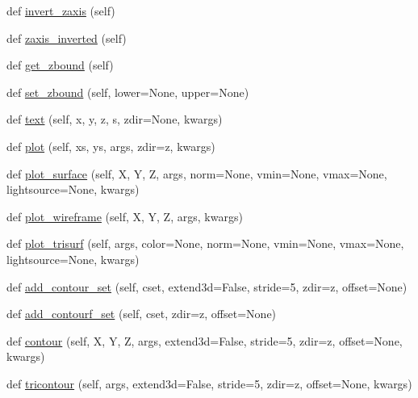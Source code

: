\begin{DoxyCompactItemize}
def \hyperlink{classmplot3d_1_1axes3d_1_1Axes3D_afa06e93a70a6ea388d1f2026d8059d83}{invert\+\_\+zaxis} (self)
\item 
def \hyperlink{classmplot3d_1_1axes3d_1_1Axes3D_ae332252730d8e20553a41721dbe2fb73}{zaxis\+\_\+inverted} (self)
\item 
def \hyperlink{classmplot3d_1_1axes3d_1_1Axes3D_a5d4d170245bd34e25ca95d4eb6bd33b8}{get\+\_\+zbound} (self)
\item 
def \hyperlink{classmplot3d_1_1axes3d_1_1Axes3D_a45c10ea43444d6412e067064ee717bc7}{set\+\_\+zbound} (self, lower=None, upper=None)
\item 
def \hyperlink{classmplot3d_1_1axes3d_1_1Axes3D_a64c3ce87e480a1f76cf3857b14985ca7}{text} (self, x, y, z, s, zdir=None, kwargs)
\item 
def \hyperlink{classmplot3d_1_1axes3d_1_1Axes3D_ad222e8f23a743b1088f1650b9623f0fa}{plot} (self, xs, ys, args, zdir=\textquotesingle{}z\textquotesingle{}, kwargs)
\item 
def \hyperlink{classmplot3d_1_1axes3d_1_1Axes3D_af856a122bcabcfb808d722945f63b92e}{plot\+\_\+surface} (self, X, Y, Z, args, norm=None, vmin=None, vmax=None, lightsource=None, kwargs)
\item 
def \hyperlink{classmplot3d_1_1axes3d_1_1Axes3D_ac7a2ef822768bc60ba66561271bfde03}{plot\+\_\+wireframe} (self, X, Y, Z, args, kwargs)
\item 
def \hyperlink{classmplot3d_1_1axes3d_1_1Axes3D_a80f6004338703041b0e59bbe43eb8cee}{plot\+\_\+trisurf} (self, args, color=None, norm=None, vmin=None, vmax=None, lightsource=None, kwargs)
\item 
def \hyperlink{classmplot3d_1_1axes3d_1_1Axes3D_a916a7e79476cb4755550ea65dfda6e79}{add\+\_\+contour\+\_\+set} (self, cset, extend3d=False, stride=5, zdir=\textquotesingle{}z\textquotesingle{}, offset=None)
\item 
def \hyperlink{classmplot3d_1_1axes3d_1_1Axes3D_a6c2ceae2166f1fbc8de9cede3a3f3637}{add\+\_\+contourf\+\_\+set} (self, cset, zdir=\textquotesingle{}z\textquotesingle{}, offset=None)
\item 
def \hyperlink{classmplot3d_1_1axes3d_1_1Axes3D_a983c5966ebf379b8100d156f4e5672ee}{contour} (self, X, Y, Z, args, extend3d=False, stride=5, zdir=\textquotesingle{}z\textquotesingle{}, offset=None, kwargs)
\item 
def \hyperlink{classmplot3d_1_1axes3d_1_1Axes3D_a15944a728b8fb94ec37ece15e87cd49b}{tricontour} (self, args, extend3d=False, stride=5, zdir=\textquotesingle{}z\textquotesingle{}, offset=None, kwargs)

\end{DoxyCompactItemize}
